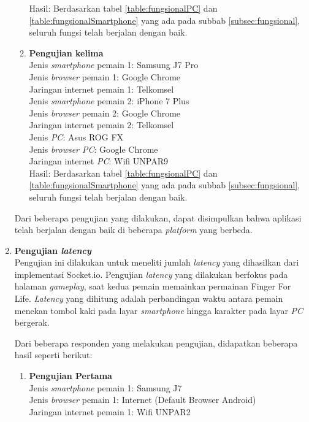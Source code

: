 \begin{enumerate}
\begin{enumerate}
		Hasil: Berdasarkan tabel \ref{table:fungsionalPC} dan \ref{table:fungsionalSmartphone} yang ada pada subbab \ref{subsec:fungsional}, seluruh fungsi telah berjalan dengan baik.
		
		\item \textbf{Pengujian kelima} \\
		Jenis \textit{smartphone} pemain 1: Samsung J7 Pro\\
		Jenis \textit{browser} pemain 1: Google Chrome\\
		Jaringan internet pemain 1: Telkomsel\\
		
		Jenis \textit{smartphone} pemain 2: iPhone 7 Plus\\
		Jenis \textit{browser} pemain 2: Google Chrome\\
		Jaringan internet pemain 2: Telkomsel\\
		
		Jenis \textit{PC}: Asus ROG FX\\
		Jenis \textit{browser PC}: Google Chrome\\
		Jaringan internet \textit{PC}: Wifi UNPAR9\\
		
		Hasil: Berdasarkan tabel \ref{table:fungsionalPC} dan \ref{table:fungsionalSmartphone} yang ada pada subbab \ref{subsec:fungsional}, seluruh fungsi telah berjalan dengan baik.
	\end{enumerate}

	Dari beberapa pengujian yang dilakukan, dapat disimpulkan bahwa aplikasi telah berjalan dengan baik di beberapa \textit{platform} yang berbeda.
	
	
	\item \textbf{Pengujian \textit{latency}} \\
	Pengujian ini dilakukan untuk meneliti jumlah \textit{latency} yang dihasilkan dari implementasi Socket.io. Pengujian \textit{latency} yang dilakukan berfokus pada halaman \textit{gameplay}, saat kedua pemain memainkan permainan Finger For Life. \textit{Latency} yang dihitung adalah perbandingan waktu antara pemain menekan tombol kaki pada layar \textit{smartphone} hingga karakter pada layar \textit{PC} bergerak. 
	
	Dari beberapa responden yang melakukan pengujian, didapatkan beberapa hasil seperti berikut:
	
	\begin{enumerate}
		\item \textbf{Pengujian Pertama} \\ 
		Jenis \textit{smartphone} pemain 1: Samsung J7\\
		Jenis \textit{browser} pemain 1: Internet (Default Browser Android)\\
		Jaringan internet pemain 1: Wifi UNPAR2\\
		

\end{enumerate}
\end{enumerate}
